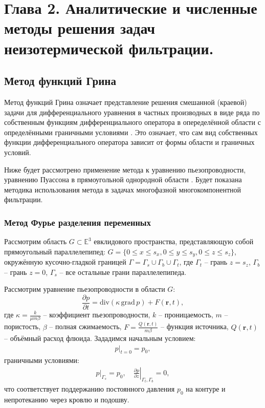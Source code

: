 \section*{Глава 2. Аналитические и численные методы решения задач неизотермической фильтрации.}
\setcounter{section}{2}
\setcounter{subsection}{0}
\setcounter{equation}{0}

\subsection{Метод функций Грина}
	Метод функций Грина означает представление решения смешанной (краевой) задачи для дифференциального уравнения в частных производных в виде ряда по собственным функциям дифференциального оператора в опеределённой  области с определёнными граничными условиями \cite{vladimirov}.
	Это означает, что сам вид собственных функции дифференциального оператора зависит от формы области и граничных условий.
	
	Ниже будет рассмотрено применение метода к уравнению пьезопроводности, уравнению Пуассона в прямоугольной однородной области \cite{aziz_green}. Будет показана методика использования метода в задачах многофазной многокомпонентной фильтрации.

\subsubsection{Метод Фурье разделения переменных}
		Рассмотрим область $G \subset \mathbb{E}^3$ евклидового пространства, представляющую собой прямоугольный параллелепипед: $G = \{0 \leq x \leq s_x, 0 \leq y \leq s_y, 0 \leq z \leq s_z\}$, окружённую кусочно-гладкой границей $\Gamma = \Gamma_s \cup \Gamma_b \cup \Gamma_t$, где $\Gamma_t$ -- грань $z=s_z$, $\Gamma_b$ -- грань $z=0$, $\Gamma_s$ -- все остальные грани параллелепипеда.
	
	Рассмотрим уравнение пьезопроводности в области $G$:
\begin{equation}
	\label{piezo}
	\frac{\partial{p}}{\partial{t}} = \text{div}\left(\kappa\,\text{grad}\,p\right) + F\left(\boldsymbol{r}, t\right),
\end{equation}
	где $\kappa = \displaystyle\frac{k}{\mu m\beta}$ -- коэффициент пьезопроводности,
	$k$ -- проницаемость,
	$m$ -- пористость,
	$\beta$ -- полная сжимаемость,
	$F = \displaystyle\frac{Q(\boldsymbol{r},t )}{m\beta}$ -- функция источника, 
	$Q(\boldsymbol{r},t )$ -- объёмный расход флюида.
	Зададимся начальным условием:
\begin{align}
	\label{initial}
	p|_{t = 0} = p_0,
\end{align}		
	граничными условиями:
\begin{align}
	\label{boundary}
	p|_{\Gamma_s} = p_0, \quad \left.\frac{\partial{p}}{\partial{z}}\right|_{\Gamma_t, \Gamma_b} = 0,
\end{align}	
	что соответствует поддержанию постоянного давления $p_0$ на контуре и непротеканию через кровлю и подошву.
	
